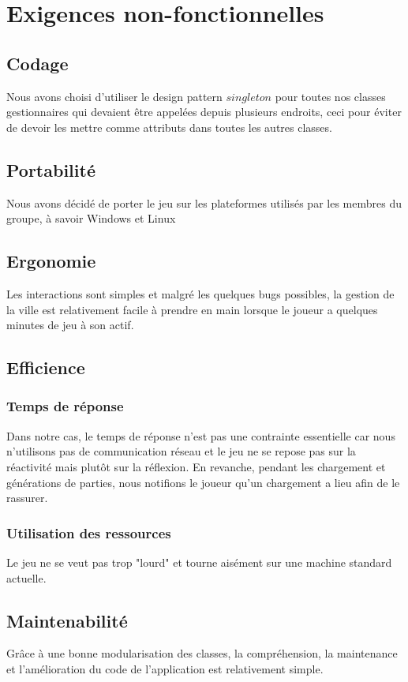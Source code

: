 \documentclass[a4paper,10pt,openany,oneside]{report}
\begin{document}
\section{Exigences non-fonctionnelles}
\subsection{Codage}
Nous avons choisi d'utiliser le design pattern $singleton$ pour toutes nos classes gestionnaires qui devaient être appelées depuis plusieurs endroits, ceci pour éviter de devoir les mettre comme attributs dans toutes les autres classes.
\subsection{Portabilité}
Nous avons décidé de porter le jeu sur les plateformes utilisés par les membres du groupe, à savoir Windows et Linux
\subsection{Ergonomie}
Les interactions sont simples et malgré les quelques bugs possibles, la gestion de la ville est relativement facile à prendre en main lorsque le joueur a quelques minutes de jeu à son actif.
\subsection{Efficience}
\subsubsection{Temps de réponse}
Dans notre cas, le temps de réponse n'est pas une contrainte essentielle car nous n'utilisons pas de communication réseau et le jeu ne se repose pas sur la réactivité mais plutôt sur la réflexion. En revanche, pendant les chargement et générations de parties, nous notifions le joueur qu'un chargement a lieu afin de le rassurer.
\subsubsection{Utilisation des ressources}
Le jeu ne se veut pas trop "lourd" et tourne aisément sur une machine standard actuelle.
\subsection{Maintenabilité}
Grâce à une bonne modularisation des classes, la compréhension, la maintenance et l'amélioration du code de l'application est relativement simple.
\end{document}
